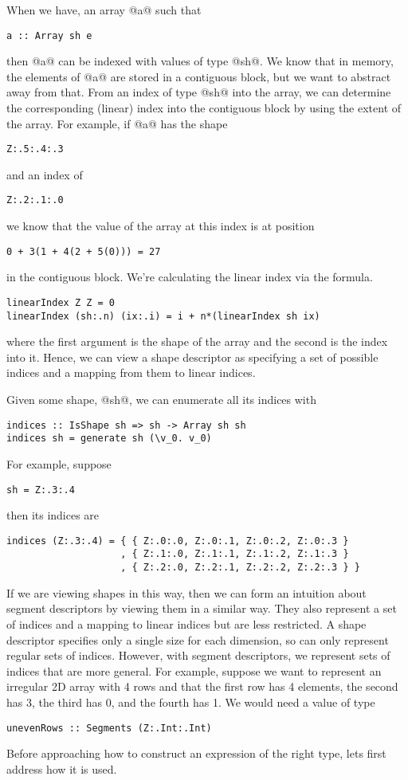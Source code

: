 When we have, an array @a@ such that
%
\begin{lstlisting}
a :: Array sh e
\end{lstlisting}
%
then @a@ can be indexed with values of type @sh@. We know that in memory, the elements of @a@ are stored in a contiguous block, but we want to abstract away from that. From an index of type @sh@ into the array, we can determine the corresponding (linear) index into the contiguous block by using the extent of the array. For example, if @a@ has the shape
%
\begin{lstlisting}
Z:.5:.4:.3
\end{lstlisting}
%
and an index of
%
\begin{lstlisting}
Z:.2:.1:.0
\end{lstlisting}
%
we know that the value of the array at this index is at position
%
\begin{lstlisting}
0 + 3(1 + 4(2 + 5(0))) = 27
\end{lstlisting}
%
in the contiguous block. We're calculating the linear index via the formula.
%
\begin{lstlisting}
linearIndex Z Z = 0
linearIndex (sh:.n) (ix:.i) = i + n*(linearIndex sh ix)
\end{lstlisting}
%
where the first argument is the shape of the array and the second is the index into it. Hence, we can view a shape descriptor as specifying a set of possible indices and a mapping from them to linear indices.

Given some shape, @sh@, we can enumerate all its indices with
%
\begin{lstlisting}
indices :: IsShape sh => sh -> Array sh sh
indices sh = generate sh (\v_0. v_0)
\end{lstlisting}
%
For example, suppose
%
\begin{lstlisting}
sh = Z:.3:.4
\end{lstlisting}
%
then its indices are
%
\begin{lstlisting}
indices (Z:.3:.4) = { { Z:.0:.0, Z:.0:.1, Z:.0:.2, Z:.0:.3 }
                    , { Z:.1:.0, Z:.1:.1, Z:.1:.2, Z:.1:.3 }
                    , { Z:.2:.0, Z:.2:.1, Z:.2:.2, Z:.2:.3 } }
\end{lstlisting}

If we are viewing shapes in this way, then we can form an intuition about segment descriptors by viewing them in a similar way. They also represent a set of indices and a mapping to linear indices but are less restricted. A shape descriptor specifies only a single size for each dimension, so can only represent regular sets of indices. However, with segment descriptors, we represent sets of indices that are more general. For example, suppose we want to represent an irregular 2D array with 4 rows and that the first row has 4 elements, the second has 3, the third has 0, and the fourth has 1. We would need a value of type
%
\begin{lstlisting}
unevenRows :: Segments (Z:.Int:.Int)
\end{lstlisting}
%
Before approaching how to construct an expression of the right type, lets first address how it is used.

